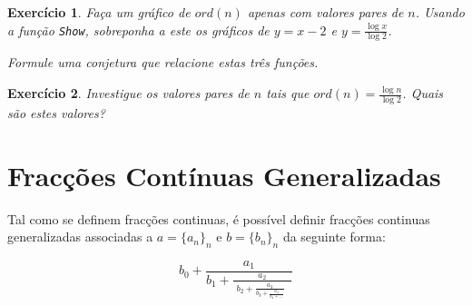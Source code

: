 \documentclass{article}
\newtheorem{ex}{Exercício}[section]
\begin{document}
\begin{ex}
Faça um gráfico de $ord(n)$ apenas com valores pares de $n$. Usando a função \texttt{Show}, sobreponha a este os gráficos de $y = x-2$ e $y = \frac{\log x}{\log2}$.

Formule uma conjetura que relacione estas três funções.
\end{ex}

\begin{ex}
Investigue os valores pares de $n$ tais que $ord(n) = \frac{\log n}{\log 2}$. Quais são estes valores?
\end{ex}

\section{Fracções Contínuas Generalizadas}

Tal como se definem fracções continuas, é possível definir fracções continuas generalizadas associadas a $a=\{a_n\}_n$ e $b=\{b_n\}_n$ da seguinte forma:

$$b_0+\displaystyle{ \frac{a_1 }
{ b_1+\displaystyle{\frac{a_2}{ 
                           {\begin{array}{l}
                              b_2+\displaystyle{ \frac{a_3}{b_3+ \displaystyle \frac{a_4}{b_4+\ldots } }  }\,\, 
                           \end{array}
                           }
                           }}}} $$

\vspace{1mm}
\end{document}
